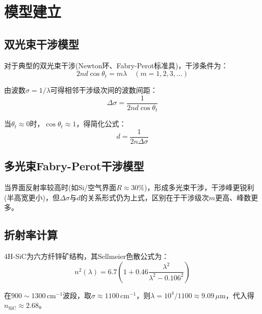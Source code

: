 \documentclass[12pt,a4paper]{article}
\begin{document}
\section{模型建立}

\subsection{双光束干涉模型}
对于典型的双光束干涉(Newton环、Fabry-Perot标准具)，干涉条件为：
\begin{equation}
2 n d \cos\theta_t = m \lambda \quad (m = 1,2,3,\dots)
\end{equation}

由波数$\sigma=1/\lambda$可得相邻干涉级次间的波数间距：
\begin{equation}
\Delta\sigma = \frac{1}{2 n d \cos\theta_t}
\end{equation}

当$\theta_t \approx 0$时，$\cos\theta_t \approx 1$，得简化公式：
\begin{equation}
d = \frac{1}{2 n \Delta\sigma}
\end{equation}

\subsection{多光束Fabry-Perot干涉模型}
当界面反射率较高时(如Si/空气界面$R\approx 30\%$)，形成多光束干涉，干涉峰更锐利(半高宽更小)，但$\Delta\sigma$与$d$的关系形式仍为上式，区别在于干涉级次$m$更高、峰数更多。

\subsection{折射率计算}
4H-SiC为六方纤锌矿结构，其Sellmeier色散公式为：
\begin{equation}
n^2(\lambda) = 6.7\left(1 + 0.46\frac{\lambda^2}{\lambda^2 - 0.106^2}\right)
\end{equation}

在$900\sim1300\,\text{cm}^{-1}$波段，取$\sigma \approx 1100\,\text{cm}^{-1}$，则$\lambda = 10^4/1100 \approx 9.09\,\mu\text{m}$，代入得$n_{\text{SiC}} \approx 2.68$。
\end{document}
